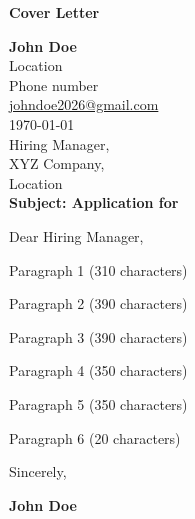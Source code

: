 \documentclass[a4paper,12pt]{article}
\begin{document}

\begin{center}
{\LARGE \textbf{\textcolor{darknavy}{Cover Letter}}}
\end{center}

\noindent
\textbf{John Doe} \\
Location \\
Phone number \\
\href{mailto:johndoe2026@gmail.com}{johndoe2026@gmail.com} \\

\noindent
\today \\

\noindent
Hiring Manager, \\
XYZ  Company, \\
Location \\

\noindent
\textbf{Subject: Application for }

\vspace{0.5cm}
\noindent
Dear Hiring Manager,

Paragraph 1 (310 characters)

\vspace{0.3cm}

Paragraph 2 (390 characters)

\vspace{0.3cm}

Paragraph 3 (390 characters)

\vspace{0.3cm}

Paragraph 4 (350 characters)

\vspace{0.3cm}

Paragraph 5 (350 characters)

\vspace{0.3cm}

Paragraph 6 (20 characters)

\vspace{0.1cm}

\noindent
Sincerely,

\noindent
\textbf{John Doe}
\end{document}
